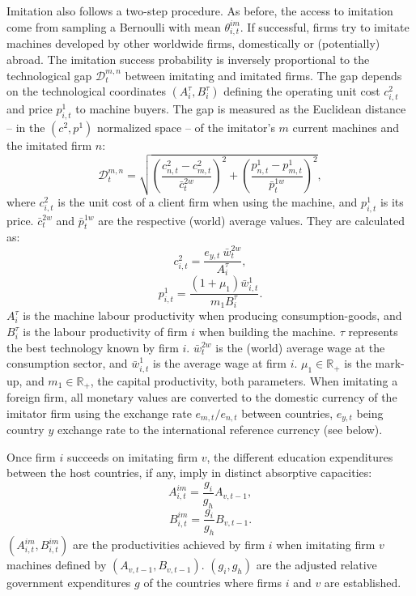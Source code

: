 \documentclass[a4paper,11pt]{article}
\begin{document}
\begin{appendices}
Imitation also follows a two-step procedure. As before, the access to imitation come from sampling a Bernoulli with mean $\theta_{i,t}^{im}$. If successful, firms try to imitate machines developed by other worldwide firms, domestically or (potentially) abroad. The imitation success probability is inversely proportional to the technological gap $\mathcal{D}_t^{m,n}$ between imitating and imitated firms. The gap depends on the technological coordinates $(A_i^\tau, B_i^\tau)$ defining the operating unit cost $c_{i,t}^2$ and price $p_{i,t}^1$ to machine buyers. The gap is measured as the Euclidean distance -- in the $(c^2, p^1)$ normalized space -- of the imitator's $m$ current machines and the imitated firm $n$:
\begin{equation}
	\mathcal{D}_t^{m,n} = \sqrt{ \left( \dfrac{ c_{n,t}^2 - c_{m,t}^2 }{ \bar{c}_t^{2w} } \right)^2 + \left( \dfrac{ p_{n,t}^1 - p_{m,t}^1 }{ \bar{p}_t^{1w} } \right)^2 },
\end{equation}
where $c_{i,t}^2$ is the unit cost of a client firm when using the machine, and $p_{i,t}^1$ is its price. $\bar{c}_t^{2w}$ and $\bar{p}_t^{1w}$ are the respective (world) average values. They are calculated as:
\begin{equation}
	c_{i,t}^2 = \dfrac{ e_{y,t} ~ \bar{w}_t^{2w} }{ A_i^\tau },
\end{equation}
\begin{equation}
	p_{i,t}^1 = \dfrac{ \left( 1 + \mu_1 \right) \bar{w}_{i,t}^1 }{ m_1 B_i^\tau }.
\end{equation}
$A_i^\tau$ is the machine labour productivity when producing consumption-goods, and $B_i^\tau$ is the labour productivity of firm $i$ when building the machine. $\tau$ represents the best technology known by firm $i$. $\bar{w}_t^{2w}$ is the (world) average wage at the consumption sector, and $\bar{w}_{i,t}^1$ is the average wage at firm $i$. $\mu_1 \in \mathbb{R}_+$ is the mark-up, and $m_1 \in \mathbb{R}_+$, the capital productivity, both parameters. When imitating a foreign firm, all monetary values are converted to the domestic currency of the imitator firm using the exchange rate $e_{m,t} / e_{n,t}$ between countries, $e_{y,t}$ being country $y$ exchange rate to the international reference currency (see below).

Once firm $i$ succeeds on imitating firm $v$, the different education expenditures between the host countries, if any, imply in distinct absorptive capacities:
\begin{equation}
	A_{i,t}^{im} = \frac{ g_i }{ g_h } A_{v,t-1},
	\label{imiProdA}
\end{equation}
\begin{equation}
	B_{i,t}^{im} = \frac{ g_i }{ g_h } B_{v,t-1}.
	\label{imiProdB}
\end{equation}
$(A_{i,t}^{im}, B_{i,t}^{im})$ are the productivities achieved by firm $i$ when imitating firm $v$  machines defined by $(A_{v,t-1}, B_{v,t-1})$. $( g_i, g_h )$ are the adjusted relative government expenditures $g$ of the countries where firms $i$ and $v$ are established.


\end{appendices}
\end{document}
